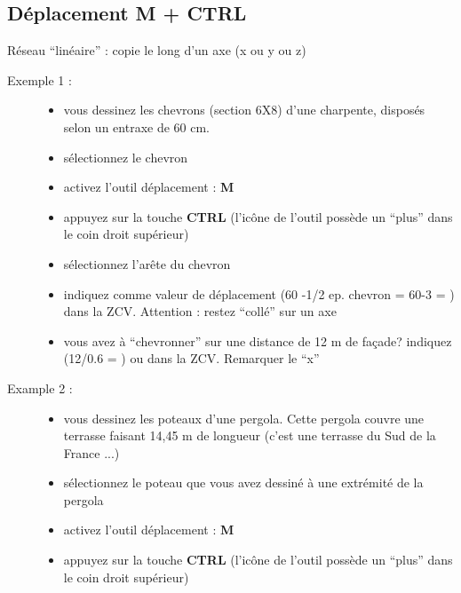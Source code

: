 \documentclass[a4paper,12pt,french]{sphinxmanual}
\begin{document}
\subsection{Déplacement M + CTRL}
\label{su/clonage:deplacement-m-ctrl}
Réseau ``linéaire'' : copie le long d'un axe (x ou y ou z)
\begin{description}
\item[{Exemple 1 :}] \leavevmode\begin{itemize}
\item {} 
vous dessinez les chevrons (section 6X8) d'une charpente, disposés selon un entraxe de 60 cm.

\item {} 
sélectionnez le chevron

\item {} 
activez l'outil déplacement : \textbf{M}

\item {} 
appuyez sur la touche \textbf{CTRL} (l'icône de l'outil possède un ``plus'' dans le coin droit supérieur)

\item {} 
sélectionnez l'arête du chevron

\item {} 
indiquez comme valeur de déplacement (60 -1/2 ep. chevron = 60-3 = ) \sphinxcode{57 cm} dans la ZCV. Attention : restez ``collé'' sur un axe

\item {} 
vous avez à ``chevronner'' sur une distance de 12 m de façade? indiquez (12/0.6 = )  ou  dans la ZCV. Remarquer le ``x''

\end{itemize}

\item[{Example 2 :}] \leavevmode\begin{itemize}
\item {} 
vous dessinez les poteaux d'une pergola. Cette pergola couvre une terrasse faisant 14,45 m de longueur (c'est une terrasse du Sud de la France ...)

\item {} 
sélectionnez le poteau que vous avez dessiné à une extrémité de la pergola

\item {} 
activez l'outil déplacement : \textbf{M}

\item {} 
appuyez sur la touche \textbf{CTRL} (l'icône de l'outil possède un ``plus'' dans le coin droit supérieur)


\end{itemize}
\end{description}
\end{document}
